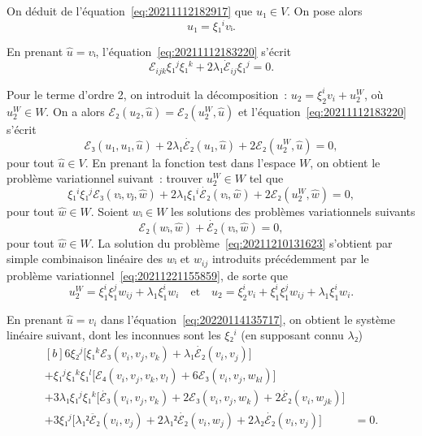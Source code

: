 \documentclass[12pt, final]{amsart}
\begin{document}
On déduit de l'équation~\eqref{eq:20211112182917} que \(u₁∈V\). On pose alors
\begin{equation}
  \label{eq:20220124135236}
  u₁=ξ₁^i vᵢ.
\end{equation}

En prenant \(\hat{u}=vᵢ\), l'équation~\eqref{eq:20211112183220} s'écrit
\begin{equation}
  ℰ_{ijk}ξ₁^jξ₁^k+2λ₁\dot{ℰ}_{ij}ξ₁^j=0.
\end{equation}

Pour le terme d'ordre 2, on introduit la décomposition~:
\(u_2=ξ_2^iv_i+u_2^W\), où \(u_2^W∈W\). On a alors
\(ℰ₂(u_2, \hat{u})=ℰ₂(u_2^W, \hat{u})\) et l'équation~\eqref{eq:20211112183220}
s'écrit
\begin{equation}
  ℰ₃(u₁, u₁, \hat{u})+2λ₁\dot{ℰ₂}(u₁, \hat{u})
  +2ℰ₂(u_2^W, \hat{u})=0,
\end{equation}
pour tout \(\hat{u}∈V\). En prenant la fonction test dans l'espace \(W\), on
obtient le problème variationnel suivant~: trouver \(u_2^W∈W\) tel que
\begin{equation}
  \label{eq:20211210131623}
  ξ₁^iξ₁^jℰ₃(vᵢ, vⱼ, \hat{w})
  +2λ₁ξ₁^i\dot{ℰ₂}(vᵢ, \hat{w})
  +2ℰ₂(u_2^W, \hat{w})=0,
\end{equation}
pour tout \(\hat{w}∈W\). Soient \(wᵢ∈W\) les solutions des problèmes
variationnels suivants
\begin{equation}
  ℰ₂(wᵢ, \hat{w})+\dot{ℰ₂}(vᵢ, \hat{w})=0,
\end{equation}
pour tout \(\hat{w}∈W\). La solution du problème~\eqref{eq:20211210131623}
s'obtient par simple combinaison linéaire des \(wᵢ\) et \(w_{ij}\) introduits
précédemment par le problème variationnel~\eqref{eq:20211221155859}, de sorte
que
\begin{equation}
  \label{eq:20220124135324}
  u_2^W=ξ_1^iξ_1^jw_{ij}+λ_1ξ_1^i w_i
  \quad\text{et}\quad
  u_2=ξ_2^iv_i+ξ_1^iξ_1^jw_{ij}+λ_1ξ_1^i w_i.
\end{equation}

En prenant \(\hat{u}=v_i\) dans l'équation~\eqref{eq:20220114135717}, on
obtient le système linéaire suivant, dont les inconnues sont les \(ξ₂^i\) (en
supposant connu \(λ₂\))
\begin{equation}
  \begin{aligned}[b]
    6ξ₂^j\bigl[ξ₁^kℰ₃(v_i, v_j, v_k)+λ₁\dot{ℰ₂}(v_i, v_j)\bigr]&\\
    +ξ₁^jξ₁^kξ₁^l\bigl[ℰ₄(v_i, v_j, v_k, v_l)+6ℰ₃(v_i, v_j, w_{kl})\bigr]&\\
    +3λ₁ξ₁^jξ₁^k\bigl[\dot{ℰ₃}(v_i, v_j, v_k)+2ℰ₃(v_i, v_j, w_k)+2\dot{ℰ₂}(v_i, w_{jk})\bigr]&\\
    +3ξ₁^j\bigl[λ₁²\ddot{ℰ₂}(v_i, v_j)+2λ₁²\dot{ℰ₂}(v_i, w_j)+2λ₂\dot{ℰ₂}(v_i, v_j)\bigr]
    &=0.
  \end{aligned}
\end{equation}
\end{document}
